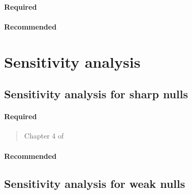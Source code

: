 \documentclass[12pt]{article}
\begin{document}
\paragraph*{Required}

\begin{verse}
\end{verse}

\paragraph*{Recommended}

\begin{verse}
\end{verse}

\section{Sensitivity analysis}

\subsection{Sensitivity analysis for sharp nulls}

\paragraph*{Required}

\begin{verse} Chapter 4 of  \end{verse}

\begin{verse}  \end{verse}

\paragraph*{Recommended}

\begin{verse}  \end{verse}

\begin{verse}  \end{verse}

\subsection{Sensitivity analysis for weak nulls}
\end{document}
